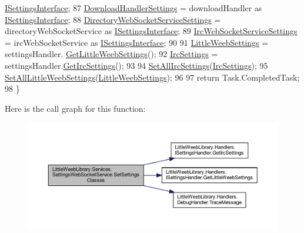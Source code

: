 \begin{DoxyCode}
      \mbox{\hyperlink{interface_little_weeb_library_1_1_global_interfaces_1_1_i_settings_interface}{ISettingsInterface}};
87             \mbox{\hyperlink{class_little_weeb_library_1_1_services_1_1_settings_web_socket_service_a9286d8fe383ca7d602cf880d70cc8057}{DownloadHandlerSettings}} = downloadHandler as 
      \mbox{\hyperlink{interface_little_weeb_library_1_1_global_interfaces_1_1_i_settings_interface}{ISettingsInterface}};
88             \mbox{\hyperlink{class_little_weeb_library_1_1_services_1_1_settings_web_socket_service_a834b0e787537121601b42a10c0f66b11}{DirectoryWebSocketServiceSettings}} = directoryWebSocketService 
      as \mbox{\hyperlink{interface_little_weeb_library_1_1_global_interfaces_1_1_i_settings_interface}{ISettingsInterface}};
89             \mbox{\hyperlink{class_little_weeb_library_1_1_services_1_1_settings_web_socket_service_a08fdc44efb1b6f74ee5fa72943346ff4}{IrcWebSocketServiceSettings}} = ircWebSocketService as 
      \mbox{\hyperlink{interface_little_weeb_library_1_1_global_interfaces_1_1_i_settings_interface}{ISettingsInterface}};
90 
91             \mbox{\hyperlink{class_little_weeb_library_1_1_settings_1_1_little_weeb_settings}{LittleWeebSettings}} = settingsHandler.
      \mbox{\hyperlink{interface_little_weeb_library_1_1_handlers_1_1_i_settings_handler_a493bc8df18211fa8c3874371b809e006}{GetLittleWeebSettings}}();
92             \mbox{\hyperlink{class_little_weeb_library_1_1_settings_1_1_irc_settings}{IrcSettings}} = settingsHandler.\mbox{\hyperlink{interface_little_weeb_library_1_1_handlers_1_1_i_settings_handler_a8ee9be789e628c80fae0db96d890569b}{GetIrcSettings}}();
93 
94             \mbox{\hyperlink{class_little_weeb_library_1_1_services_1_1_settings_web_socket_service_a6eba1d3b176e627d3dae57070e1c3beb}{SetAllIrcSettings}}(\mbox{\hyperlink{class_little_weeb_library_1_1_settings_1_1_irc_settings}{IrcSettings}});
95             \mbox{\hyperlink{class_little_weeb_library_1_1_services_1_1_settings_web_socket_service_a5ae643bad024f7eca3178d5359886f6f}{SetAllLittleWeebSettings}}(\mbox{\hyperlink{class_little_weeb_library_1_1_settings_1_1_little_weeb_settings}{LittleWeebSettings}});
96 
97             \textcolor{keywordflow}{return} Task.CompletedTask;
98         \}
\end{DoxyCode}
Here is the call graph for this function\+:\nopagebreak
\begin{figure}[H]
\begin{center}
\leavevmode
\includegraphics[width=350pt]{class_little_weeb_library_1_1_services_1_1_settings_web_socket_service_af799e00c29f6eec4ca8874cda559c225_cgraph}
\end{center}
\end{figure}

